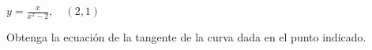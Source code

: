 \setcounter{enumi}{46}
\item $\displaystyle y = \frac{x}{x^2 - 2}, \quad (2, 1)$
\par
Obtenga la ecuación de la tangente de la curva dada en el punto indicado.
